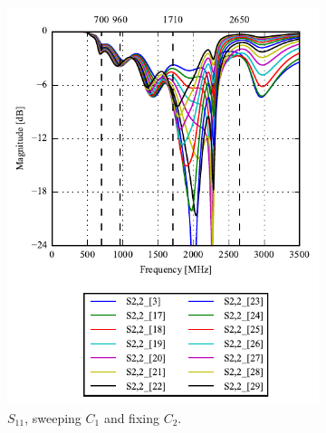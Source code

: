 \begin{figure}[htbp]
\begin{subfigure}[b]{0.49\linewidth}
        \includegraphics{img/tech_sol/monopole/talk_mode/s22}
        \caption{$S_{11}$, sweeping $C_1$ and fixing $C_2$.}
        \label{fig:ant1_s22}
    \end{subfigure}
~
    \begin{subfigure}[b]{0.49\linewidth}
        \centering

\end{subfigure}
\end{figure}
